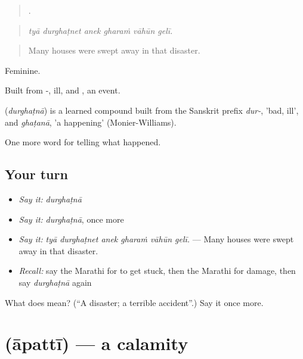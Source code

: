 \begin{quote}
     .
\end{quote}

\begin{quote}
\emph{tyā durghaṭnet anek gharaṁ vāhūn gelī.}
\end{quote}

\begin{quote}
Many houses were swept away in that disaster.
\end{quote}

Feminine.

Built from -, ill, and , an event.

\begin{cousinweb}
\textbf{} (\emph{durghaṭnā}) is a learned compound built from the Sanskrit prefix \emph{dur-}, 'bad, ill', and \emph{ghaṭanā}, 'a happening' (Monier-Williams).
\end{cousinweb}

\begin{grammarlens}[title={What you've built}]
One more word for telling what happened.
\end{grammarlens}

\subsection*{Your turn}
\begin{itemize}
\raggedright
  \item \emph{Say it:} \emph{durghaṭnā}
  \item \emph{Say it:} \emph{durghaṭnā}, once more
  \item \emph{Say it:} \emph{tyā durghaṭnet anek gharaṁ vāhūn gelī.} — Many houses were swept away in that disaster.
  \item \emph{Recall:} say the Marathi for to get stuck, then the Marathi for damage, then say \emph{durghaṭnā} again
\end{itemize}

\begin{tcolorbox}[breakable,colback=teal!4,colframe=teal!35!black,title={Before you move on}]
What does  mean? (\textquotedblleft{}A disaster; a terrible accident\textquotedblright{}.) Say it once more.
\end{tcolorbox}
\section[\texorpdfstring{\mr{आपत्ती} (āpattī)}{आपत्ती (āpattī)}]{ (āpattī) — a calamity}

